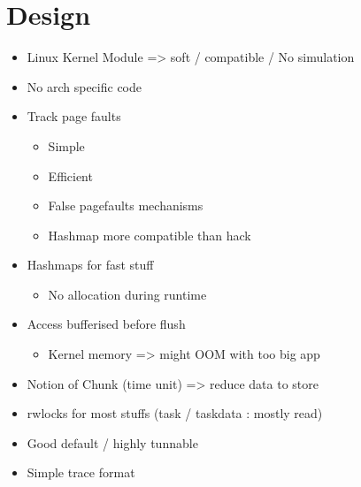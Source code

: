 \section{Design}
\label{sec:design}

\begin{itemize}
    \item Linux Kernel Module => soft / compatible / No simulation
    \item No arch specific code
    \item Track page faults
        \begin{itemize}
            \item Simple
            \item Efficient
            \item False pagefaults mechanisms
            \item Hashmap more compatible than hack
        \end{itemize}
    \item Hashmaps for fast stuff
        \begin{itemize}
            \item No allocation during runtime
        \end{itemize}
    \item Access bufferised before flush
        \begin{itemize}
            \item Kernel memory => might OOM with too big app
        \end{itemize}
    \item Notion of Chunk (time unit) => reduce data to store
    \item rwlocks for most stuffs (task / taskdata : mostly read)
    \item Good default / highly tunnable
    \item Simple trace format
\end{itemize}
